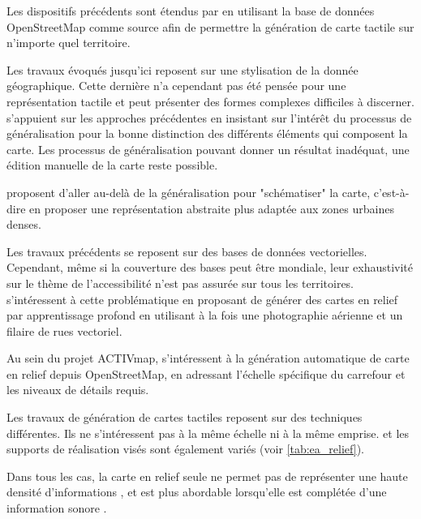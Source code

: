 Les dispositifs précédents sont étendus par \cite{Watanabe2014, Cervenka2016} en utilisant la base de données OpenStreetMap comme source afin de permettre la génération de carte tactile sur n'importe quel territoire.

Les travaux évoqués jusqu'ici reposent sur une stylisation de la donnée géographique. Cette dernière n'a cependant pas été pensée pour une représentation tactile et peut présenter des formes complexes difficiles à discerner. \cite{Stampach2016} s'appuient sur les approches précédentes en insistant sur l’intérêt du processus de généralisation pour la bonne distinction des différents éléments qui composent la carte. Les processus de généralisation pouvant donner un résultat inadéquat, une édition manuelle de la carte reste possible.

\cite{Touya2019} proposent d'aller au-delà de la généralisation pour "schématiser" la carte, c'est-à-dire en proposer une représentation abstraite plus adaptée aux zones urbaines denses. 

Les travaux précédents se reposent sur des bases de données vectorielles. Cependant, même si la couverture des bases peut être mondiale, leur exhaustivité sur le thème de l'accessibilité n'est pas assurée sur tous les territoires. \cite{FillieresRiveau2020} s'intéressent à cette problématique en proposant de générer des cartes en relief par apprentissage profond en utilisant à la fois une photographie aérienne et un filaire de rues vectoriel. 

Au sein du projet ACTIVmap, \cite{Jiang2023} s'intéressent à la génération automatique de carte en relief depuis OpenStreetMap, en adressant l'échelle spécifique du carrefour et les niveaux de détails requis.

\newpar{}

Les travaux de génération de cartes tactiles reposent sur des techniques différentes. Ils ne s'intéressent pas à la même échelle ni à la même emprise. et les supports de réalisation visés sont également variés (voir \ref{tab:ea_relief}).

Dans tous les cas, la carte en relief seule ne permet pas de représenter une haute densité d'informations \cite{Touya2019}, et est plus abordable lorsqu'elle est complétée d'une information sonore \cite{Brock2015}.


